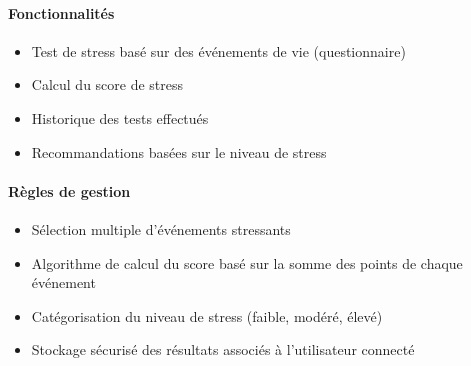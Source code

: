 \documentclass[
]{article}
\providecommand{\tightlist}{%
  \setlength{\itemsep}{0pt}\setlength{\parskip}{0pt}}
\begin{document}
\paragraph{Fonctionnalités}\label{fonctionnalituxe9s-2}

\begin{itemize}
\tightlist
\item
  Test de stress basé sur des événements de vie (questionnaire)
\item
  Calcul du score de stress
\item
  Historique des tests effectués
\item
  Recommandations basées sur le niveau de stress
\end{itemize}

\paragraph{Règles de gestion}\label{ruxe8gles-de-gestion-2}

\begin{itemize}
\tightlist
\item
  Sélection multiple d’événements stressants
\item
  Algorithme de calcul du score basé sur la somme des points de chaque
  événement
\item
  Catégorisation du niveau de stress (faible, modéré, élevé)
\item
  Stockage sécurisé des résultats associés à l’utilisateur connecté
\end{itemize}
\end{document}
